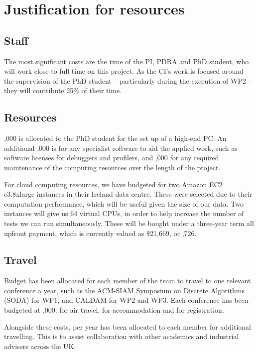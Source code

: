 \documentclass[a4paper,11pt]{article}
\begin{document}
    \section{Justification for resources}

    \subsection{Staff}

    The most significant costs are the time of the PI, PDRA and PhD student, who will work close to full time on this project. As the CI's work is focused around the supervision of the PhD student -- particularly during the execution of WP2 -- they will contribute 25\% of their time.

    \subsection{Resources}

    ,000 is allocated to the PhD student for the set up of a high-end PC. An additional ,000 is for any specialist software to aid the applied work, such as software licenses for debuggers and profilers, and ,000 for any required maintenance of the computing resources over the length of the project.

    For cloud computing resources, we have budgeted for two Amazon EC2 c3.8xlarge instances in their Ireland data centre. These were selected due to their computation performance, which will be useful given the size of our data. Two instances will give us 64 virtual CPUs, in order to help increase the number of tests we can run simultaneously. These will be bought under a three-year term all upfront payment, which is currently valued as \$21,669, or ,726.

    \subsection{Travel}

    Budget has been allocated for each member of the team to travel to one relevant conference a year, such as the ACM-SIAM Symposium on Discrete Algorithms (SODA) for WP1, and CALDAM for WP2 and WP3. Each conference has been budgeted at ,000:  for air travel,  for accommodation and  for registration.

    Alongside these costs,  per year has been allocated to each member for additional travelling. This is to assist collaboration with other academics and industrial advisers across the UK.
\end{document}
